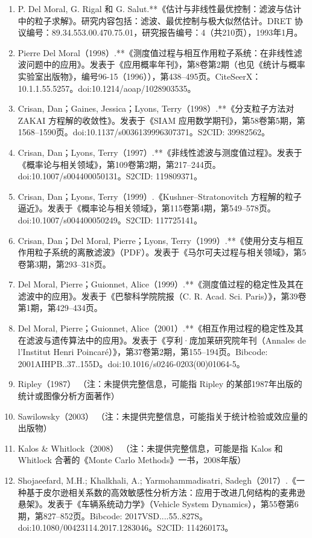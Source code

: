 \begin{enumerate}
\item P. Del Moral, G. Rigal 和 G. Salut.**《估计与非线性最优控制：滤波与估计中的粒子求解》。研究内容包括：滤波、最优控制与极大似然估计。DRET 协议编号：89.34.553.00.470.75.01，研究报告编号：4（共210页），1993年1月。
\item Pierre Del Moral（1998）.**《测度值过程与相互作用粒子系统：在非线性滤波问题中的应用》。发表于《应用概率年刊》，第8卷第2期（也见《统计与概率实验室出版物》，编号96-15（1996）），第438–495页。CiteSeerX：10.1.1.55.5257。doi:10.1214/aoap/1028903535。
\item Crisan, Dan；Gaines, Jessica；Lyons, Terry（1998）.**《分支粒子方法对 ZAKAI 方程解的收敛性》。发表于《SIAM 应用数学期刊》，第58卷第5期，第1568–1590页。doi:10.1137/s0036139996307371。S2CID: 39982562。
\item Crisan, Dan；Lyons, Terry（1997）.**《非线性滤波与测度值过程》。发表于《概率论与相关领域》，第109卷第2期，第217–244页。doi:10.1007/s004400050131。S2CID: 119809371。
\item Crisan, Dan；Lyons, Terry（1999）.《Kushner–Stratonovitch 方程解的粒子逼近》。发表于《概率论与相关领域》，第115卷第4期，第549–578页。doi:10.1007/s004400050249。S2CID: 117725141。
\item Crisan, Dan；Del Moral, Pierre；Lyons, Terry（1999）.**《使用分支与相互作用粒子系统的离散滤波》（PDF）。发表于《马尔可夫过程与相关领域》，第5卷第3期，第293–318页。
\item Del Moral, Pierre；Guionnet, Alice（1999）.**《测度值过程的稳定性及其在滤波中的应用》。发表于《巴黎科学院院报（C. R. Acad. Sci. Paris）》，第39卷第1期，第429–434页。
\item Del Moral, Pierre；Guionnet, Alice（2001）.**《相互作用过程的稳定性及其在滤波与遗传算法中的应用》。发表于《亨利·庞加莱研究院年刊（Annales de l'Institut Henri Poincaré）》，第37卷第2期，第155–194页。Bibcode: 2001AIHPB..37..155D。doi:10.1016/s0246-0203(00)01064-5。
\item Ripley（1987）
（注：未提供完整信息，可能指 Ripley 的某部1987年出版的统计或图像分析方面著作）
\item Sawilowsky（2003）
（注：未提供完整信息，可能指关于统计检验或效应量的出版物）
\item Kalos & Whitlock（2008）
（注：未提供完整信息，可能是指 Kalos 和 Whitlock 合著的《Monte Carlo Methods》一书，2008年版）
\item Shojaeefard, M.H.; Khalkhali, A.; Yarmohammadisatri, Sadegh（2017）.《一种基于皮尔逊相关系数的高效敏感性分析方法：应用于改进几何结构的麦弗逊悬架》。发表于《车辆系统动力学》（Vehicle System Dynamics），第55卷第6期，第827–852页。Bibcode: 2017VSD....55..827S。doi:10.1080/00423114.2017.1283046。S2CID: 114260173。

\end{enumerate}
